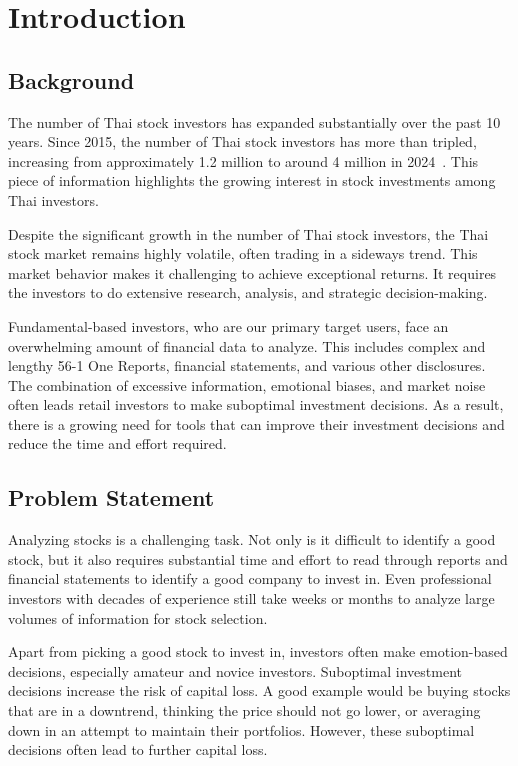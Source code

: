 \chapter{Introduction}
\label{chap:introduction}

\section{Background}
\label{section:background}

The number of Thai stock investors has expanded substantially over the past 10 years.
Since 2015, the number of Thai stock investors has more than tripled, increasing from
approximately 1.2 million to around 4 million in 2024~\cite{SETStatistics2024}.
This piece of information highlights the growing interest in stock investments among Thai investors.

Despite the significant growth in the number of Thai stock investors, the Thai stock market remains highly volatile,
often trading in a sideways trend. This market behavior makes it challenging to achieve exceptional returns.
It requires the investors to do extensive research, analysis, and strategic decision-making.

Fundamental-based investors, who are our primary target users, face an overwhelming amount of financial data to analyze.
This includes complex and lengthy 56-1 One Reports, financial statements, and various other disclosures.
The combination of excessive information, emotional biases, and market noise often leads retail investors to make suboptimal investment decisions.
As a result, there is a growing need for tools that can improve their investment decisions and reduce the time and effort required.

\section{Problem Statement}
\label{section:problem-statement}

Analyzing stocks is a challenging task. Not only is it difficult to identify a good stock, but it also requires substantial time and effort
to read through reports and financial statements to identify a good company to invest in. Even professional investors with decades of experience
still take weeks or months to analyze large volumes of information for stock selection.

Apart from picking a good stock to invest in, investors often make emotion-based decisions, especially amateur and novice investors.
Suboptimal investment decisions increase the risk of capital loss. A good example would be buying stocks that are in a downtrend, thinking the
price should not go lower, or averaging down in an attempt to maintain their portfolios. However, these suboptimal decisions often lead to
further capital loss.

